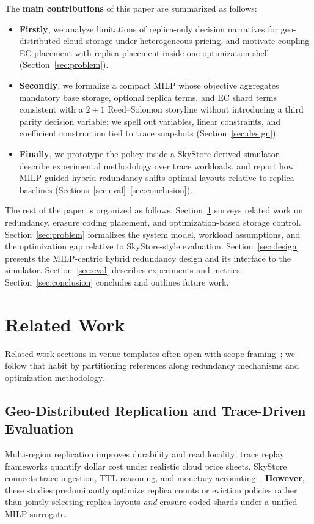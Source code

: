 \documentclass[conference]{IEEEtran}
\begin{document}
The \textbf{main contributions} of this paper are summarized as follows:
\begin{itemize}
\item \textbf{Firstly}, we analyze limitations of replica-only decision narratives for geo-distributed cloud storage under heterogeneous pricing, and motivate coupling EC placement with replica placement inside one optimization shell (Section~\ref{sec:problem}).
\item \textbf{Secondly}, we formalize a compact MILP whose objective aggregates mandatory base storage, optional replica terms, and EC shard terms consistent with a \(2{+}1\) Reed--Solomon storyline without introducing a third parity decision variable; we spell out variables, linear constraints, and coefficient construction tied to trace snapshots (Section~\ref{sec:design}).
\item \textbf{Finally}, we prototype the policy inside a SkyStore-derived simulator, describe experimental methodology over trace workloads, and report how MILP-guided hybrid redundancy shifts optimal layouts relative to replica baselines (Sections~\ref{sec:eval}--\ref{sec:conclusion}).
\end{itemize}

The rest of the paper is organized as follows.
Section~\ref{sec:related} surveys related work on redundancy, erasure coding placement, and optimization-based storage control.
Section~\ref{sec:problem} formalizes the system model, workload assumptions, and the optimization gap relative to SkyStore-style evaluation.
Section~\ref{sec:design} presents the MILP-centric hybrid redundancy design and its interface to the simulator.
Section~\ref{sec:eval} describes experiments and metrics.
Section~\ref{sec:conclusion} concludes and outlines future work.

\section{Related Work}
\label{sec:related}

Related work sections in venue templates often open with scope framing~\cite{milp_survey_storage}; we follow that habit by partitioning references along redundancy mechanisms and optimization methodology.

\subsection{Geo-Distributed Replication and Trace-Driven Evaluation}
Multi-region replication improves durability and read locality; trace replay frameworks quantify dollar cost under realistic cloud price sheets.
SkyStore connects trace ingestion, TTL reasoning, and monetary accounting~\cite{skystore}.
\textbf{However}, these studies predominantly optimize replica counts or eviction policies rather than jointly selecting replica layouts \emph{and} erasure-coded shards under a unified MILP surrogate.
\end{document}
